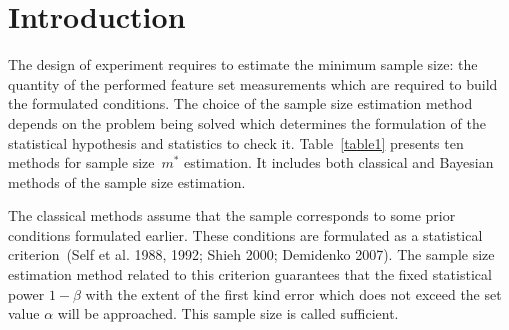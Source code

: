 \documentclass[
11pt,%
tightenlines,%
twoside,%
onecolumn,%
nofloats,%
nobibnotes,%
nofootinbib,%
superscriptaddress,%
noshowpacs,%
centertags]%
{revtex4}
\begin{document}
\section{Introduction}
The design of experiment requires to estimate the minimum sample size: the quantity of the performed feature set measurements which are required to build the formulated conditions. The choice of the sample size estimation method depends on the problem being solved which determines the formulation of the statistical hypothesis and statistics to check it. Table~\ref{table1} presents ten methods for sample size~$m^*$ estimation. It includes both classical and Bayesian methods of the sample size estimation.

The classical methods assume that the sample corresponds to some prior conditions formulated earlier. These conditions are formulated as a statistical criterion~(Self et al. 1988, 1992; Shieh 2000; Demidenko 2007). The sample size estimation method related to this criterion guarantees that the fixed statistical power $1-\beta$ with the extent of the first kind error which does not exceed the set value $\alpha$ will be approached. This sample size is called sufficient.
\end{document}
